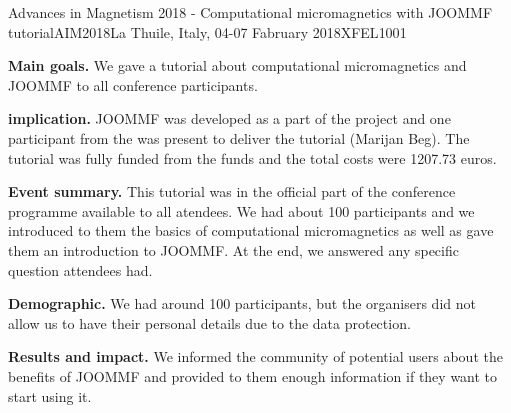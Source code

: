 \begin{event}{Advances in Magnetism 2018 - Computational micromagnetics with JOOMMF tutorial}{AIM2018}{La Thuile, Italy, 04-07 Fabruary 2018}{XFEL}{100}{1}{}

\textbf{Main goals.} We gave a tutorial about computational micromagnetics and JOOMMF to all conference participants.

\textbf{\ODK implication.} JOOMMF was developed as a part of the \ODK project and one participant from the \ODK was present to deliver the tutorial (Marijan Beg). The tutorial was fully funded from the \ODK funds and the total costs were 1207.73 euros.

\textbf{Event summary.} This tutorial was in the official part of the conference programme available to all atendees. We had about 100 participants and we introduced to them the basics of computational micromagnetics as well as gave them an introduction to JOOMMF. At the end, we answered any specific question attendees had.

\textbf{Demographic.} We had around 100 participants, but the organisers did not allow us to have their personal details due to the data protection.

\textbf{Results and impact.} We informed the community of potential users about the benefits of JOOMMF and provided to them enough information if they want to start using it.

\end{event}
